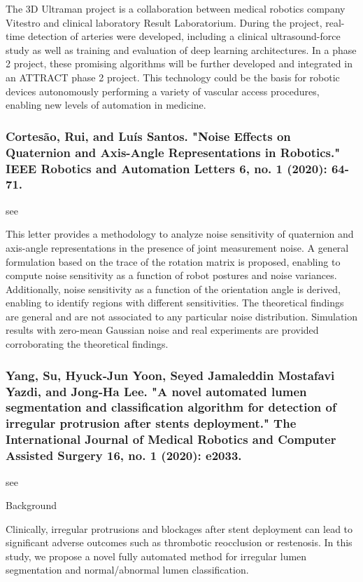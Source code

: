 \documentclass[conference]{IEEEtran}
\begin{document}
The 3D Ultraman project is a collaboration between medical robotics company Vitestro and clinical laboratory Result Laboratorium.
During the project, real-time detection of arteries were developed, including a clinical ultrasound-force study as well as training and
evaluation of deep learning architectures. In a phase 2 project, these promising algorithms will be further developed and integrated in an
ATTRACT phase 2 project. This technology could be the basis for robotic devices autonomously performing a variety of vascular access
procedures, enabling new levels of automation in medicine.

\medskip
\subsubsection{Cortesão, Rui, and Luís Santos. "Noise Effects on Quaternion and Axis-Angle Representations in Robotics." IEEE Robotics and Automation Letters 6, no. 1 (2020): 64-71.}
see \cite{cortesao2020noise}

This letter provides a methodology to analyze noise sensitivity of quaternion and axis-angle representations in the presence of joint measurement noise. A general formulation based on the trace of the rotation matrix is proposed, enabling to compute noise sensitivity as a function of robot postures and noise variances. Additionally, noise sensitivity as a function of the orientation angle is derived, enabling to identify regions with different sensitivities. The theoretical findings are general and are not associated to any particular noise distribution. Simulation results with zero-mean Gaussian noise and real experiments are provided corroborating the theoretical findings.

\medskip
\subsubsection{Yang, Su, Hyuck‐Jun Yoon, Seyed Jamaleddin Mostafavi Yazdi, and Jong‐Ha Lee. "A novel automated lumen segmentation and classification algorithm for detection of irregular protrusion after stents deployment." The International Journal of Medical Robotics and Computer Assisted Surgery 16, no. 1 (2020): e2033.}
see \cite{yang2020novel}

Background

Clinically, irregular protrusions and blockages after stent deployment can lead to significant adverse outcomes such as thrombotic reocclusion or restenosis. In this study, we propose a novel fully automated method for irregular lumen segmentation and normal/abnormal lumen classification.
\end{document}
